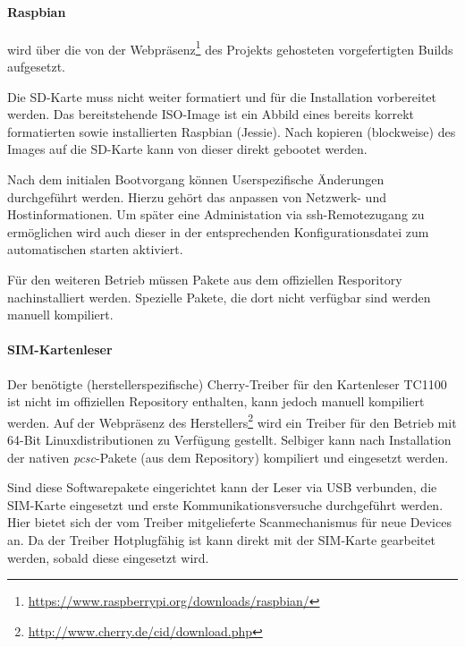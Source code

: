 			\paragraph{Raspbian} wird über die von der Webpräsenz\footnote{\url{https://www.raspberrypi.org/downloads/raspbian/}}
            des Projekts gehosteten vorgefertigten Builds aufgesetzt.

            Die SD-Karte muss nicht weiter formatiert und für die Installation vorbereitet werden. Das
            bereitstehende ISO-Image ist ein Abbild eines bereits korrekt formatierten sowie installierten
            Raspbian (Jessie). Nach kopieren (blockweise) des Images auf die SD-Karte kann von dieser direkt
            gebootet werden.

            Nach dem initialen Bootvorgang können Userspezifische Änderungen durchgeführt werden. Hierzu
            gehört das anpassen von Netzwerk- und Hostinformationen. Um später eine Administation via
            \ac{ssh}-Remotezugang zu ermöglichen wird auch dieser in der entsprechenden Konfigurationsdatei
            zum automatischen starten aktiviert.

            Für den weiteren Betrieb müssen Pakete aus dem offiziellen Resporitory
            nachinstalliert werden. Spezielle Pakete, die dort nicht verfügbar sind werden
            manuell kompiliert.

            \paragraph{SIM-Kartenleser} Der benötigte (herstellerspezifische)
            Cherry-Treiber für den Kartenleser TC1100 ist nicht im offiziellen Repository enthalten, kann jedoch
            manuell kompiliert werden. Auf der Webpräsenz des Herstellers\footnote{\url{http://www.cherry.de/cid/download.php}}
            wird ein Treiber für den Betrieb mit 64-Bit Linuxdistributionen zu Verfügung gestellt.
            Selbiger kann nach Installation der nativen \textit{pcsc}-Pakete (aus dem Repository)
            kompiliert und eingesetzt werden.

            Sind diese Softwarepakete eingerichtet kann der Leser via USB verbunden, die SIM-Karte eingesetzt
            und erste Kommunikationsversuche durchgeführt werden. Hier bietet sich der vom
            Treiber mitgelieferte Scanmechanismus für neue Devices an. Da der Treiber
            Hotplugfähig ist kann direkt mit der SIM-Karte gearbeitet werden, sobald diese
            eingesetzt wird.

